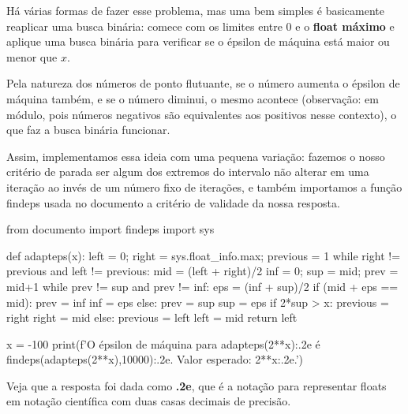 \documentclass[11pt, a4paper]{article}
\begin{document}
Há várias formas de fazer esse problema, mas uma bem simples é basicamente reaplicar uma busca binária: comece com os limites entre 0 e o \textbf{float máximo} e aplique uma busca binária para verificar se o épsilon de máquina está maior ou menor que \(x\). 

Pela natureza dos números de ponto flutuante, se o número aumenta o épsilon de máquina também, e se o número diminui, o mesmo acontece (observação: em módulo, pois números negativos são equivalentes aos positivos nesse contexto), o que faz a busca binária funcionar.

Assim, implementamos essa ideia com uma pequena variação: fazemos o nosso critério de parada ser algum dos extremos do intervalo não alterar em uma iteração ao invés de um número fixo de iterações, e também importamos a função findeps usada no documento a critério de validade da nossa resposta.

\begin{code}
from documento import findeps
import sys

def adapteps(x):
    left = 0; right = sys.float_info.max; previous = 1
    while right != previous and left != previous:
        mid = (left + right)/2
        inf = 0; sup = mid; prev = mid+1
        while prev != sup and prev != inf:
            eps = (inf + sup)/2
            if (mid + eps == mid):
                prev = inf
                inf = eps
            else:
                prev = sup
                sup = eps
        if 2*sup > x:
            previous = right
            right = mid
        else:
            previous = left
            left = mid
    return left

x = -100
print(f'O épsilon de máquina para {adapteps(2**x):.2e} é {findeps(adapteps(2**x),10000):.2e}. Valor esperado: {2**x:.2e}.')
\end{code}

Veja que a resposta foi dada como \textbf{.2e}, que é a notação para representar floats em notação científica com duas casas decimais de precisão.
\end{document}
